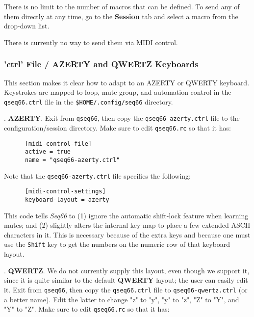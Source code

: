    There is no limit to the number of macros that can be defined.
   To send any of them directly at any time, go to the
   \textbf{Session} tab and select a macro from the drop-down list.

   There is currently no way to send them via MIDI control.




\subsubsection{'ctrl' File / AZERTY and QWERTZ Keyboards}
\label{subsubsec:configuration_ctrl_azerty}

   This section makes it clear how to adapt to an AZERTY or QWERTY keyboard.
   Keystrokes are mapped to loop, mute-group, and automation control in the
   \texttt{qseq66.ctrl} file in the \texttt{\$HOME/.config/seq66} directory.

   .
   \textbf{AZERTY}.
   Exit from \texttt{qseq66}, then copy the \texttt{qseq66-azerty.ctrl}
   file to the configuration/session directory.
   Make sure to edit \texttt{qseq66.rc} so that it has:

   \begin{verbatim}
      [midi-control-file]
      active = true
      name = "qseq66-azerty.ctrl"
   \end{verbatim}

   Note that the \texttt{qseq66-azerty.ctrl} file specifies the following:

   \begin{verbatim}
      [midi-control-settings]
      keyboard-layout = azerty
   \end{verbatim}

   This code tells \textsl{Seq66} to (1) ignore the automatic shift-lock
   feature when learning mutes; and (2) slightly alters the internal key-map to
   place a few extended ASCII characters in it.  This is necessary because of
   the extra keys and because one must use the
   \texttt{Shift} key to get the numbers on
   the numeric row of that keyboard layout.

   .
   \textbf{QWERTZ}.
   We do not currently supply this layout, even though we support it, since it is
   quite similar to the default \textbf{QWERTY} layout;
   the user can easily edit it.
   Exit from \texttt{qseq66}, then copy the \texttt{qseq66.ctrl}
   file to \texttt{qseq66-qwertz.ctrl} (or a better name).  Edit the latter to
   change "z" to "y", "y" to "z", "Z" to "Y", and "Y" to "Z".
   Make sure to edit \texttt{qseq66.rc} so that it has:

